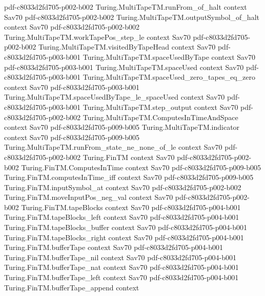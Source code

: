 \begin{theorem}
  {pdf-c8033d2fd705-p002-b002}
\proofstep
  {Turing.MultiTapeTM.runFrom_of_halt}
  {context}
  {Sav70}
  {pdf-c8033d2fd705-p002-b002}
\proofstep
  {Turing.MultiTapeTM.outputSymbol_of_halt}
  {context}
  {Sav70}
  {pdf-c8033d2fd705-p002-b002}
\proofstep
  {Turing.MultiTapeTM.workTapePos_step_le}
  {context}
  {Sav70}
  {pdf-c8033d2fd705-p002-b002}
\proofstep
  {Turing.MultiTapeTM.visitedByTapeHead}
  {context}
  {Sav70}
  {pdf-c8033d2fd705-p003-b001}
\proofstep
  {Turing.MultiTapeTM.spaceUsedByTape}
  {context}
  {Sav70}
  {pdf-c8033d2fd705-p003-b001}
\proofstep
  {Turing.MultiTapeTM.spaceUsed}
  {context}
  {Sav70}
  {pdf-c8033d2fd705-p003-b001}
\proofstep
  {Turing.MultiTapeTM.spaceUsed_zero_tapes_eq_zero}
  {context}
  {Sav70}
  {pdf-c8033d2fd705-p003-b001}
\proofstep
  {Turing.MultiTapeTM.spaceUsedByTape_le_spaceUsed}
  {context}
  {Sav70}
  {pdf-c8033d2fd705-p003-b001}
\proofstep
  {Turing.MultiTapeTM.step_output}
  {context}
  {Sav70}
  {pdf-c8033d2fd705-p002-b002}
\proofstep
  {Turing.MultiTapeTM.ComputesInTimeAndSpace}
  {context}
  {Sav70}
  {pdf-c8033d2fd705-p009-b005}
\proofstep
  {Turing.MultiTapeTM.indicator}
  {context}
  {Sav70}
  {pdf-c8033d2fd705-p009-b005}
\proofstep
  {Turing.MultiTapeTM.runFrom_state_ne_none_of_le}
  {context}
  {Sav70}
  {pdf-c8033d2fd705-p002-b002}
\proofstep
  {Turing.FinTM}
  {context}
  {Sav70}
  {pdf-c8033d2fd705-p002-b002}
\proofstep
  {Turing.FinTM.ComputesInTime}
  {context}
  {Sav70}
  {pdf-c8033d2fd705-p009-b005}
\proofstep
  {Turing.FinTM.computesInTime_iff}
  {context}
  {Sav70}
  {pdf-c8033d2fd705-p009-b005}
\proofstep
  {Turing.FinTM.inputSymbol_at}
  {context}
  {Sav70}
  {pdf-c8033d2fd705-p002-b002}
\proofstep
  {Turing.FinTM.moveInputPos_neg_val}
  {context}
  {Sav70}
  {pdf-c8033d2fd705-p002-b002}
\proofstep
  {Turing.FinTM.tapeBlocks}
  {context}
  {Sav70}
  {pdf-c8033d2fd705-p004-b001}
\proofstep
  {Turing.FinTM.tapeBlocks_left}
  {context}
  {Sav70}
  {pdf-c8033d2fd705-p004-b001}
\proofstep
  {Turing.FinTM.tapeBlocks_buffer}
  {context}
  {Sav70}
  {pdf-c8033d2fd705-p004-b001}
\proofstep
  {Turing.FinTM.tapeBlocks_right}
  {context}
  {Sav70}
  {pdf-c8033d2fd705-p004-b001}
\proofstep
  {Turing.FinTM.bufferTape}
  {context}
  {Sav70}
  {pdf-c8033d2fd705-p004-b001}
\proofstep
  {Turing.FinTM.bufferTape_nil}
  {context}
  {Sav70}
  {pdf-c8033d2fd705-p004-b001}
\proofstep
  {Turing.FinTM.bufferTape_nat}
  {context}
  {Sav70}
  {pdf-c8033d2fd705-p004-b001}
\proofstep
  {Turing.FinTM.bufferTape_left}
  {context}
  {Sav70}
  {pdf-c8033d2fd705-p004-b001}
\proofstep
  {Turing.FinTM.bufferTape_append}
  {context}

\end{theorem}
